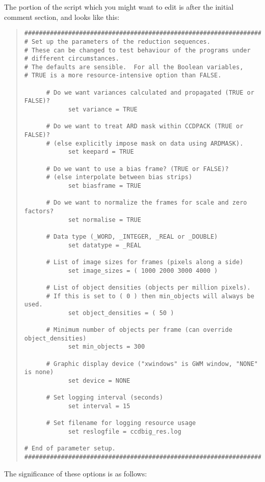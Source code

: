 The portion of the script which you might want to edit 
is after the initial comment section, and looks like this:
\begin{quote}
\begin{verbatim}
###################################################################
# Set up the parameters of the reduction sequences.
# These can be changed to test behaviour of the programs under
# different circumstances.
# The defaults are sensible.  For all the Boolean variables, 
# TRUE is a more resource-intensive option than FALSE.

      # Do we want variances calculated and propagated (TRUE or FALSE)?
            set variance = TRUE

      # Do we want to treat ARD mask within CCDPACK (TRUE or FALSE)?  
      # (else explicitly impose mask on data using ARDMASK).
            set keepard = TRUE

      # Do we want to use a bias frame? (TRUE or FALSE)?
      # (else interpolate between bias strips)
            set biasframe = TRUE

      # Do we want to normalize the frames for scale and zero factors?
            set normalise = TRUE

      # Data type (_WORD, _INTEGER, _REAL or _DOUBLE)
            set datatype = _REAL

      # List of image sizes for frames (pixels along a side)
            set image_sizes = ( 1000 2000 3000 4000 )

      # List of object densities (objects per million pixels).
      # If this is set to ( 0 ) then min_objects will always be used.
            set object_densities = ( 50 )

      # Minimum number of objects per frame (can override object_densities)
            set min_objects = 300

      # Graphic display device ("xwindows" is GWM window, "NONE" is none)
            set device = NONE

      # Set logging interval (seconds)
            set interval = 15

      # Set filename for logging resource usage
            set reslogfile = ccdbig_res.log

# End of parameter setup.
###################################################################
\end{verbatim}
\end{quote}
The significance of these options is as follows:
